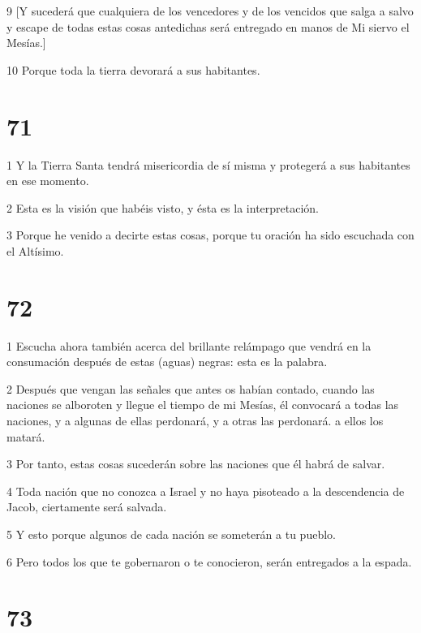 \par 9 [Y sucederá que cualquiera de los vencedores y de los vencidos que salga a salvo y escape de todas estas cosas antedichas será entregado en manos de Mi siervo el Mesías.]

\par 10 Porque toda la tierra devorará a sus habitantes.

\chapter{71}

\par 1 Y la Tierra Santa tendrá misericordia de sí misma y protegerá a sus habitantes en ese momento.

\par 2 Esta es la visión que habéis visto, y ésta es la interpretación.

\par 3 Porque he venido a decirte estas cosas, porque tu oración ha sido escuchada con el Altísimo.

\chapter{72}

\par 1 Escucha ahora también acerca del brillante relámpago que vendrá en la consumación después de estas (aguas) negras: esta es la palabra.

\par 2 Después que vengan las señales que antes os habían contado, cuando las naciones se alboroten y llegue el tiempo de mi Mesías, él convocará a todas las naciones, y a algunas de ellas perdonará, y a otras las perdonará. a ellos los matará.

\par 3 Por tanto, estas cosas sucederán sobre las naciones que él habrá de salvar.

\par 4 Toda nación que no conozca a Israel y no haya pisoteado a la descendencia de Jacob, ciertamente será salvada.

\par 5 Y esto porque algunos de cada nación se someterán a tu pueblo.

\par 6 Pero todos los que te gobernaron o te conocieron, serán entregados a la espada.

\chapter{73}


